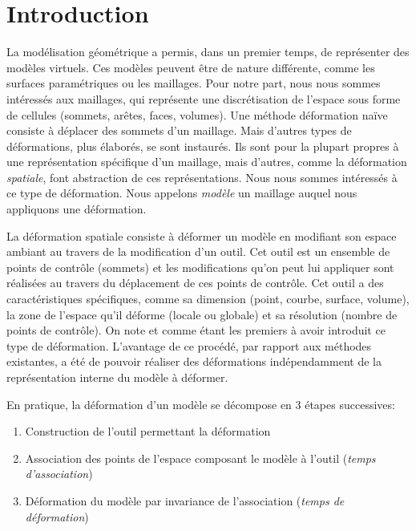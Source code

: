 
\chapter{Introduction}

\graphicspath{ {Introduction/IntroductionFigs/PNG/}
  {Introduction/IntroductionFigs/PDF/}
  {Introduction/IntroductionFigs/} }

La modélisation géométrique a permis, dans un premier temps, de représenter
des modèles virtuels. Ces modèles peuvent être de nature différente, comme les
surfaces paramétriques ou les maillages. Pour notre part, nous nous sommes
intéressés aux maillages, qui représente une discrétisation de l'espace sous
forme de cellules (sommets, arêtes, faces, volumes). Une méthode déformation
naïve consiste à déplacer des sommets d'un maillage. Mais d'autres types de
déformations, plus élaborés, se sont instaurés. Ils sont pour la plupart
propres à une représentation spécifique d'un maillage, mais d'autres, comme la
déformation \textit{spatiale}, font abstraction de ces représentations. Nous
nous sommes intéressés à ce type de déformation. Nous appelons \textit{modèle}
un maillage auquel nous appliquons une déformation.
	
La déformation spatiale consiste à déformer un modèle en modifiant son espace
ambiant au travers de la modification d'un outil. Cet outil est un ensemble de
points de contrôle (sommets) et les modifications qu'on peut lui appliquer
sont réalisées au travers du déplacement de ces points de contrôle. Cet outil
a des caractéristiques spécifiques, comme sa dimension (point, courbe,
surface, volume), la zone de l'espace qu'il déforme (locale ou globale) et sa
résolution (nombre de points de contrôle). On note \cite{Bar84} et \cite{SP86}
comme étant les premiers à avoir introduit ce type de déformation. L'avantage
de ce procédé, par rapport aux méthodes existantes, a été de pouvoir réaliser
des déformations indépendamment de la représentation interne du modèle à
déformer.

\newpage

En pratique, la déformation d'un modèle se décompose en 3 étapes successives:
\begin{enumerate}

\item Construction de l'outil permettant la déformation

\item Association des points de l'espace composant le modèle à l'outil
(\textit{temps d'association})

\item Déformation du modèle par invariance de l'association (\textit{temps de
déformation})

\end{enumerate} 

